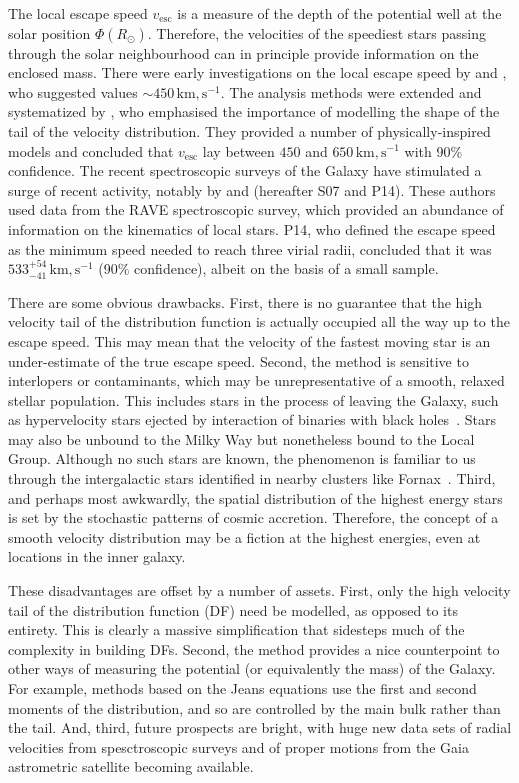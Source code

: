 \documentclass[useAMS,twocolumn,usenatbib]{mn2e}
\def\km,s{{\,\mathrm{km,s^{-1}}}}
\def\vesc{{v_\mathrm{esc}}}
\begin{document}
The local escape speed $\vesc$ is a measure of the depth of the potential well at the solar position $\Phi(R_\odot)$. 
Therefore, the velocities of the speediest stars passing through the solar neighbourhood can in principle provide information on the enclosed mass. 
There were early investigations on the local escape speed by \citet{Ca81} and \citet{Al82}, who suggested values $\sim 450\km,s$.
The analysis methods were extended and systematized by \citet{Le90}, who emphasised the importance of modelling the shape of the tail of the velocity distribution. 
They provided a number of physically-inspired models and concluded that $\vesc$ lay between $450$ and $650 \km,s$ with 90\% confidence. 
The recent spectroscopic surveys of the Galaxy have stimulated a surge of recent activity, notably by \cite{Sm07} and \cite{Pi14} (hereafter S07 and P14).
These authors used data from the RAVE spectroscopic survey, which provided an abundance of information on the kinematics of local stars. 
P14, who defined the escape speed as the minimum speed needed to reach three virial radii, concluded that it was $533^{+54}_{-41} \km,s$ (90\% confidence), albeit on the basis of a small sample.

There are some obvious drawbacks. First, there is no guarantee that the high velocity tail of the distribution function is actually occupied all the way up to the escape speed. 
This may mean that the velocity of the fastest moving star is an under-estimate of the true escape speed. 
Second, the method is sensitive to interlopers or contaminants, which may be unrepresentative of a smooth, relaxed stellar population. 
This includes stars in the process of leaving the Galaxy, such as hypervelocity stars ejected by interaction of binaries with black holes~\citep[e.g.,][]{Br15,Bou16}. 
Stars may also be unbound to the Milky Way but nonetheless bound to the Local Group. 
Although no such stars are known, the phenomenon is familiar to us through the intergalactic stars identified in nearby clusters like Fornax~\citep{Th97}. 
Third, and perhaps most awkwardly, the spatial distribution of the highest energy stars is set by the stochastic patterns of cosmic accretion. 
Therefore, the concept of a smooth velocity distribution may be a fiction at the highest energies, even at locations in the inner galaxy.

These disadvantages are offset by a number of assets. First, only the high velocity tail of the distribution function (DF) need be modelled, as opposed to its entirety. 
This is clearly a massive simplification that sidesteps much of the complexity in building DFs. 
Second, the method provides a nice counterpoint to other ways of measuring the potential (or equivalently the mass) of the Galaxy. 
For example, methods based on the Jeans equations use the first and second moments of the distribution, and so are controlled by the main bulk rather than the tail. 
And, third, future prospects are bright, with huge new data sets of radial velocities from spesctroscopic surveys and of proper motions from the Gaia astrometric satellite becoming available.
\end{document}

